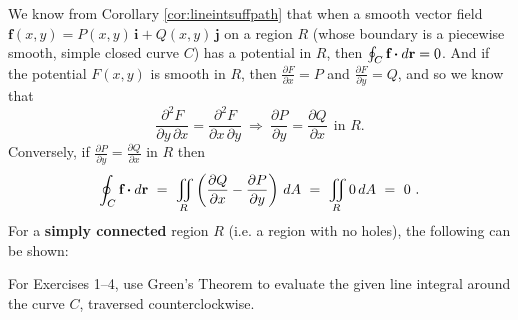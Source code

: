 We know from Corollary \ref{cor:lineintsuffpath} that when a smooth vector field
$\mathbf{f}(x,y) = P(x,y)\,\mathbf{i} + Q(x,y)\,\mathbf{j}$ on a region $R$ (whose boundary is a piecewise smooth,
simple closed curve $C$) has a potential in $R$, then $\oint_{C} \textbf{f} \bm{\cdot} d\textbf{r} = 0$. And if the potential
$F(x,y)$ is smooth in $R$, then
$\frac{\partial F}{\partial x} = P$ and $\frac{\partial F}{\partial y} = Q$, and so we know that
\begin{displaymath}
 \frac{\partial^2 F}{\partial y \,\partial x} = \frac{\partial^2 F}{\partial x \,\partial y} ~\Rightarrow~
 \frac{\partial P}{\partial y} = \frac{\partial Q}{\partial x} ~~\text{in $R$.}
\end{displaymath}
Conversely, if $\frac{\partial P}{\partial y} = \frac{\partial Q}{\partial x}$ in $R$ then
\begin{displaymath}
 \oint_{C} \textbf{f} \bm{\cdot} d\textbf{r} ~=~ \iint\limits_{R} \left( \frac{\partial Q}{\partial x} -
   \frac{\partial P}{\partial y} \right)\,dA ~=~ \iint\limits_{R} 0\,dA ~=~ 0 ~.
\end{displaymath}
For a \textbf{simply connected} region $R$ (i.e. a region with no holes), the following can be
shown:\medskip
{}
\centerline{}
\label{sec4dot3}
\par\noindent For Exercises 1--4, use Green's Theorem to evaluate the given line integral around the curve $C$, traversed
counterclockwise.

